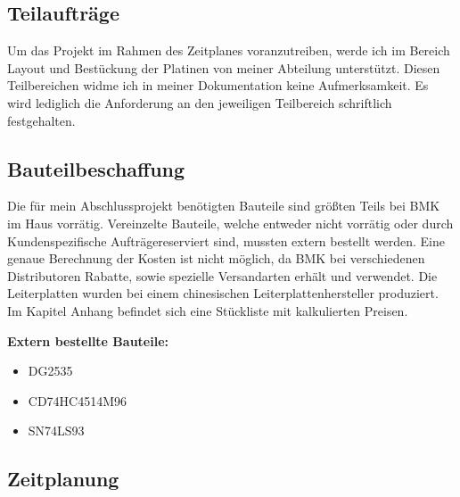 \subsection{Teilaufträge}
Um das Projekt im Rahmen des Zeitplanes voranzutreiben, werde ich im Bereich Layout und Bestückung der Platinen von meiner Abteilung unterstützt. Diesen Teilbereichen widme ich in meiner Dokumentation keine Aufmerksamkeit. Es wird lediglich die Anforderung an den jeweiligen Teilbereich schriftlich festgehalten. 

\subsection{Bauteilbeschaffung}
Die für mein Abschlussprojekt benötigten Bauteile sind größten Teils bei BMK im Haus vorrätig. Vereinzelte Bauteile, welche entweder nicht vorrätig oder durch \glqq Kundenspezifische Aufträge\grqq reserviert sind, mussten extern bestellt werden. Eine genaue Berechnung der Kosten ist nicht möglich, da BMK bei verschiedenen Distributoren Rabatte, sowie spezielle Versandarten erhält und verwendet. Die Leiterplatten wurden bei einem chinesischen Leiterplattenhersteller produziert. Im Kapitel \glqq Anhang\grqq{} befindet sich eine Stückliste mit kalkulierten Preisen.

\newpage

\textbf{Extern bestellte Bauteile:} 

\begin{itemize}
	\item{DG2535}
	
	\item{CD74HC4514M96}
	
	\item{SN74LS93}
\end{itemize}

\renewcommand{\arraystretch}{2}
\subsection{Zeitplanung}


